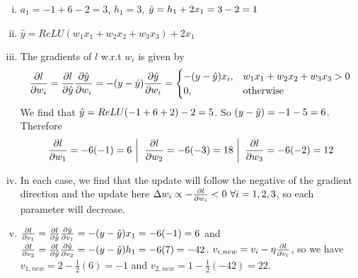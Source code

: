 
\begin{enumerate}[(i) ]
    \item $a_1 = -1 + 6 - 2 = 3$, $h_1 = 3$, $\hat{y} = h_1 + 2 x_1 = 3 - 2 = 1$
    
    
    \item $\hat{y} = ReLU(w_1 x_1 + w_2 x_2 + w_3 x_3) + 2 x_1$
    
    
    \item The gradients of $l$ w.r.t $w_i$ is given by 
    $$
    \pdv{l}{w_i} = \pdv{l}{\yh}\pdv{\yh}{w_i} = -(y - \yh)\pdv{\yh}{w_i} = 
    \begin{cases}
    -(y-\yh) x_i, & w_1 x_1 + w_2 x_2 + w_3 x_3 > 0\\
    0, &\text{otherwise}
    \end{cases}
    $$
    We find that $\hat{y} = ReLU(-1 + 6 + 2) - 2 = 5$. So $(y - \hat{y}) = -1 - 5 = 6$.
    Therefore
    $$
    \left.\pdv{l}{w_1} = -6 (-1) = 6 ~\right|~
    \left.\pdv{l}{w_2} = -6 (-3) = 18 ~\right|~
    \pdv{l}{w_3} = -6 (-2) = 12
    $$
    
    
    \item In each case, we find that the update will follow the negative of the gradient direction and the update here $\Delta w_i \propto -\pdv{l}{w_i} < 0 ~\forall i = 1,2,3$, so each parameter will decrease.
    
    
    \item $\pdv{l}{v_1} = \pdv{l}{\yh}\pdv{\yh}{v_1} = -(y-\yh)x_1 = -6(-1) = 6$ and $\pdv{l}{v_2} = \pdv{l}{\yh}\pdv{\yh}{v_2} = -(y-\yh)h_1 = -6(7) = -42$. $v_{i,new} = v_i - \eta \pdv{l}{v_i}$, so we have $v_{1,new} = 2 - \frac{1}{2}(6) = -1$ and $v_{2,new} = 1 - \frac{1}{2}(-42) = 22$.
    
    
\end{enumerate}